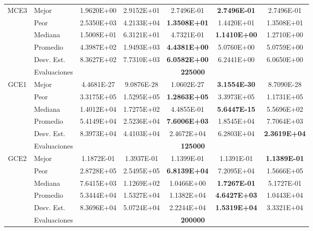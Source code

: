 \begin{table}[]
{\begin{tabular}{clccccc}
 		\hline
 		\multirow{6}{*}{MCE3} & Mejor        &1.9620E+00&2.9152E+01& 2.7496E-01&\textbf{2.7496E-01}&2.7496E-01 \\
 		& Peor         &2.5350E+03 &4.2133E+04&\textbf{1.3508E+01}&1.4420E+01&1.3508E+01 \\
 		& Mediana      &1.5008E+01&6.3121E+01&4.7321E-01&\textbf{1.1410E+00}&1.2710E+00 \\
 		& Promedio     &4.3987E+02&1.9493E+03&\textbf{4.4381E+00}&5.0760E+00&5.0759E+00 \\
 		& Desv. Est.   &8.3627E+02&7.7310E+03&\textbf{6.0582E+00}&6.2441E+00 &6.0650E+00 \\
 		& Evaluaciones &\multicolumn{5}{c}{\textbf{225000}}\\
 		\hline
 		\multirow{6}{*}{GCE1} & Mejor        &4.4681E-27&9.0876E-28&1.0602E-27&\textbf{3.1554E-30}&8.7090E-28\\
 		& Peor         &3.3175E+05&1.5295E+05&\textbf{1.2863E+05}&3.3973E+05&1.1731E+05 \\
 		& Mediana      &1.4012E+04&1.7275E+02&4.4855E-01&\textbf{5.6447E-15}&5.5696E+02 \\
 		& Promedio     &5.4149E+04&2.5236E+04&\textbf{7.6006E+03}&1.8545E+04&7.7064E+03 \\
 		& Desv. Est.   &8.3973E+04&4.4103E+04&2.4672E+04&6.2803E+04&\textbf{2.3619E+04}\\
 		& Evaluaciones &\multicolumn{5}{c}{\textbf{125000}}\\
 		\hline
 		\multirow{6}{*}{GCE2} & Mejor        &1.1872E-01&1.3937E-01&1.1399E-01 &1.1391E-01&\textbf{1.1389E-01}\\
 		& Peor         &2.8728E+05&2.5495E+05&\textbf{6.8139E+04}&7.2095E+04&1.5666E+05\\
 		& Mediana      &7.6415E+03&1.1269E+02&1.0466E+00&\textbf{1.7267E-01}&5.1727E-01\\
 		& Promedio     &5.3444E+04&1.5327E+04&1.1382E+04&\textbf{4.6427E+03}&1.0443E+04\\
 		& Desv. Est.   &8.3696E+04&5.0724E+04&2.2244E+04&\textbf{1.5319E+04}& 3.3321E+04\\
 		& Evaluaciones &\multicolumn{5}{c}{\textbf{200000}}\\
 		\hline
 	\end{tabular}
}
 \end{table}

